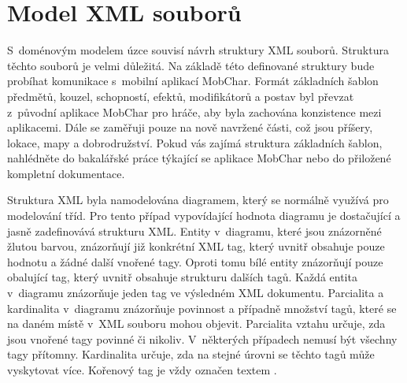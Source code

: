 \documentclass[thesis=B,czech]{resources/FITthesis}[2012/06/26]
\begin{document}
	\section{Model XML souborů}
S~doménovým modelem úzce souvisí návrh struktury XML souborů. Struktura těchto souborů je velmi důležitá. Na základě této definované struktury bude probíhat komunikace s~mobilní aplikací MobChar. Formát základních šablon předmětů, kouzel, schopností, efektů, modifikátorů a postav byl převzat z~původní aplikace MobChar pro hráče, aby byla zachována konzistence mezi aplikacemi. Dále se zaměřuji pouze na nově navržené části, což jsou příšery, lokace, mapy a dobrodružství. Pokud vás zajímá struktura základních šablon, nahlédněte do bakalářské práce týkající se aplikace MobChar\cite{Weberova_2017} nebo do přiložené kompletní dokumentace.\par

Struktura XML byla namodelována diagramem, který se normálně využívá pro modelování tříd. Pro tento případ vypovídající hodnota diagramu je dostačující a jasně zadefinovává strukturu XML. Entity v~diagramu, které jsou znázorněné žlutou barvou, znázorňují již konkrétní XML tag, který uvnitř obsahuje pouze hodnotu a žádné další vnořené tagy. Oproti tomu bílé entity znázorňují pouze obalující tag, který uvnitř obsahuje strukturu dalších tagů. Každá entita v~diagramu znázorňuje jeden tag ve výsledném XML dokumentu. Parcialita a kardinalita v~diagramu znázorňuje povinnost a případně množství tagů, které se na daném místě v~XML souboru mohou objevit. Parcialita vztahu určuje, zda jsou vnořené tagy povinné či nikoliv. V~některých případech nemusí být všechny tagy přítomny. Kardinalita určuje, zda na stejné úrovni se těchto tagů může vyskytovat více. Kořenový tag je vždy označen textem   .
\end{document}
